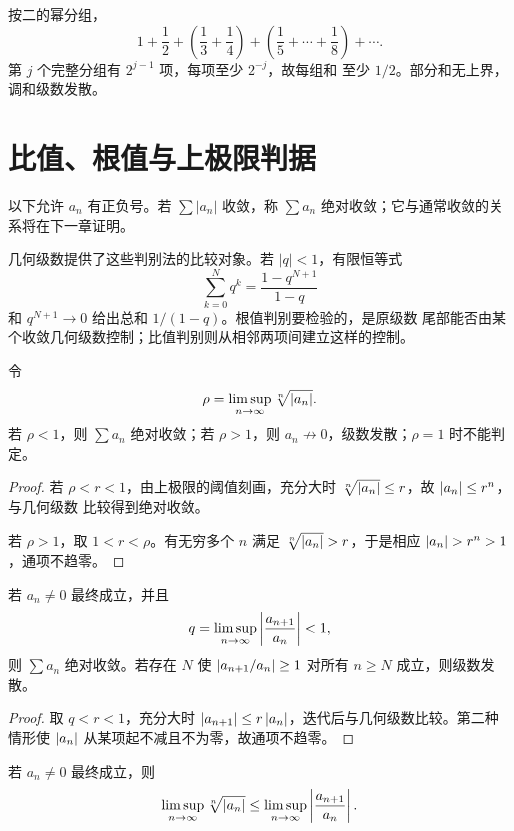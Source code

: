 \begin{example}[调和级数]
按二的幂分组，
\[
 1+\frac12+
 \left(\frac13+\frac14\right)+
 \left(\frac15+\cdots+\frac18\right)+\cdots.
\]
第 \(j\) 个完整分组有 \(2^{j-1}\) 项，每项至少 \(2^{-j}\)，故每组和
至少 \(1/2\)。部分和无上界，调和级数发散。
\end{example}

\section{比值、根值与上极限判据}

以下允许 \(a_n\) 有正负号。若 \(\sum |a_n|\) 收敛，称 \(\sum a_n\)
绝对收敛；它与通常收敛的关系将在下一章证明。

几何级数提供了这些判别法的比较对象。若 \(|q|<1\)，有限恒等式
\[
 \sum_{k=0}^Nq^k=\frac{1-q^{N+1}}{1-q}
\]
和 \(q^{N+1}\to0\) 给出总和 \(1/(1-q)\)。根值判别要检验的，是原级数
尾部能否由某个收敛几何级数控制；比值判别则从相邻两项间建立这样的控制。

\begin{theorem}[根值判别]
\label{thm:root-test}
令
\[
 \rho=\limsup_{n\to\infty}\sqrt[n]{\left|a_n\right|}.
\]
若 \(\rho<1\)，则 \(\sum a_n\) 绝对收敛；若 \(\rho>1\)，则
\(a_n\not\to0\)，级数发散；\(\rho=1\) 时不能判定。
\end{theorem}

\begin{proof}
若 \(\rho<r<1\)，由上极限的阈值刻画，充分大时
\(\sqrt[n]{\left|a_n\right|}\le r\)，故 \(\left|a_n\right|\le r^n\)，与几何级数
比较得到绝对收敛。

若 \(\rho>1\)，取 \(1<r<\rho\)。有无穷多个 \(n\) 满足
\(\sqrt[n]{\left|a_n\right|}>r\)，于是相应 \(\abs{a_n}>r^n>1\)，通项不趋零。
\end{proof}

\begin{corollary}[比值判别]
\label{thm:ratio-test}
若 \(a_n\ne0\) 最终成立，并且
\[
 q=\limsup_{n\to\infty}\left|\frac{a_{n+1}}{a_n}\right|<1,
\]
则 \(\sum a_n\) 绝对收敛。若存在 \(N\) 使
\(\left|a_{n+1}/a_n\right|\ge1\) 对所有 \(n\ge N\) 成立，则级数发散。
\end{corollary}

\begin{proof}
取 \(q<r<1\)，充分大时
\(\left|a_{n+1}\right|\le r\left|a_n\right|\)，迭代后与几何级数比较。第二种情形使
\(\left|a_n\right|\) 从某项起不减且不为零，故通项不趋零。
\end{proof}

\begin{proposition}[比值控制根值]
\label{prop:ratio-controls-root}
若 \(a_n\ne0\) 最终成立，则
\[
 \limsup_{n\to\infty}\sqrt[n]{\left|a_n\right|}
 \le
 \limsup_{n\to\infty}\left|\frac{a_{n+1}}{a_n}\right|.
\]
\end{proposition}

